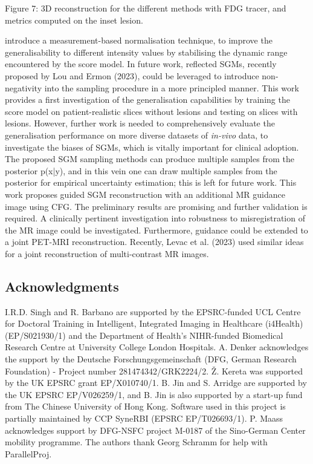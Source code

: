 \documentclass{article}
\begin{document}
Figure 7: 3D reconstruction for the different methods with FDG tracer, and metrics computed on the inset lesion.

introduce a measurement-based normalisation technique, to improve the generalisability to different intensity values by stabilising the dynamic range encountered by the score model. In future work, reflected SGMs, recently proposed by Lou and Ermon (2023), could be leveraged to introduce non-negativity into the sampling procedure in a more principled manner. This work provides a first investigation of the generalisation capabilities by training the score model on patient-realistic slices without lesions and testing on slices with lesions. However, further work is needed to comprehensively evaluate the generalisation performance on more diverse datasets of \textit{in-vivo} data, to investigate the biases of SGMs, which is vitally important for clinical adoption. The proposed SGM sampling methods can produce multiple samples from the posterior p(x|y), and in this vein one can draw multiple samples from the posterior for empirical uncertainty estimation; this is left for future work. This work proposes guided SGM reconstruction with an additional MR guidance image using CFG. The preliminary results are promising and further validation is required. A clinically pertinent investigation into robustness to misregistration of the MR image could be investigated. Furthermore, guidance could be extended to a joint PET-MRI reconstruction. Recently, Levac et al. (2023) used similar ideas for a joint reconstruction of multi-contrast MR images.

\subsection{Acknowledgments}

I.R.D. Singh and R. Barbano are supported by the EPSRC-funded UCL Centre for Doctoral Training in Intelligent, Integrated Imaging in Healthcare (i4Health) (EP/S021930/1) and the Department of Health's NIHR-funded Biomedical Research Centre at University College London Hospitals. A. Denker acknowledges the support by the Deutsche Forschungsgemeinschaft (DFG, German Research Foundation) - Project number 281474342/GRK2224/2. Ž. Kereta was supported by the UK EPSRC grant EP/X010740/1. B. Jin and S. Arridge are supported by the UK EPSRC EP/V026259/1, and B. Jin is also supported by a start-up fund from The Chinese University of Hong Kong. Software used in this project is partially maintained by CCP SyneRBI (EPSRC EP/T026693/1). P. Maass acknowledges support by DFG-NSFC project M-0187 of the Sino-German Center mobility programme. The authors thank Georg Schramm for help with ParallelProj.
\end{document}
